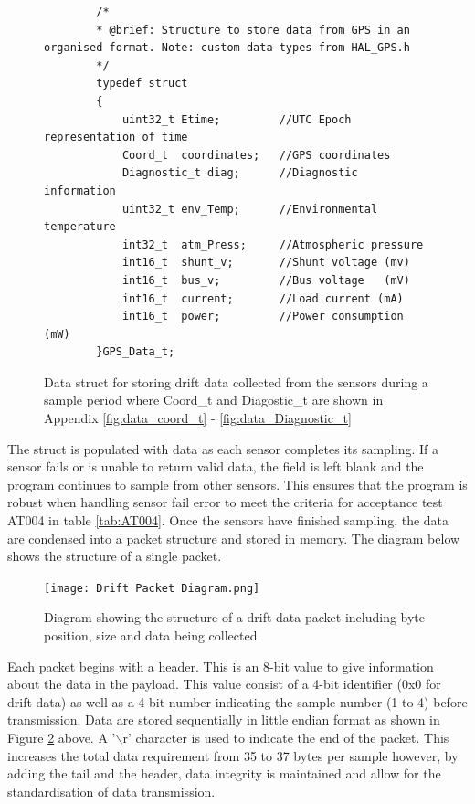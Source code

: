 \begin{figure}[H]
	\centering
	\begin{lstlisting}
		/*
		* @brief: Structure to store data from GPS in an organised format. Note: custom data types from HAL_GPS.h
		*/
		typedef struct
		{
			uint32_t Etime;			//UTC Epoch representation of time
			Coord_t  coordinates;	//GPS coordinates
			Diagnostic_t diag;		//Diagnostic information
			uint32_t env_Temp;		//Environmental temperature
			int32_t  atm_Press;		//Atmospheric pressure
			int16_t  shunt_v;       //Shunt voltage (mv)
			int16_t  bus_v;			//Bus voltage   (mV)
			int16_t  current;       //Load current (mA)
			int16_t  power;			//Power consumption (mW)
		}GPS_Data_t;
	\end{lstlisting}
	\caption{Data struct for storing drift data collected from the sensors during a sample period where Coord\_t and Diagostic\_t are shown in Appendix \ref{fig:data_coord_t} - \ref{fig:data_Diagnostic_t}} 
	\label{fig:data_drift_struct}
\end{figure}

The struct is populated with data as each sensor completes its sampling. If a sensor fails or is unable to return valid data, the field is left blank and the program continues to sample from other sensors. This ensures that the program is robust when handling sensor fail error to meet the criteria for acceptance test AT004 in table \ref{tab:AT004}. Once the sensors have finished sampling, the data are condensed into a packet structure and stored in memory. The diagram below shows the structure of a single packet.

\begin{figure}[H]
	\centering
	\texttt{[image: Drift Packet Diagram.png]}
	\caption{Diagram showing the structure of a drift data packet including byte position, size and data being collected}
	\label{fig:packet_structure}
\end{figure}

Each packet begins with a header. This is an 8-bit value to give information about the data in the payload. This value consist of a 4-bit identifier (0x0 for drift data) as well as a 4-bit number indicating the sample number (1 to 4) before transmission. Data are stored sequentially in little endian format as shown in Figure \ref{fig:packet_structure} above. A '$\backslash$r' character is used to indicate the end of the packet. This increases the total data requirement from 35 to 37 bytes per sample however, by adding the tail and the header, data integrity is maintained and allow for the standardisation of data transmission.\par  

